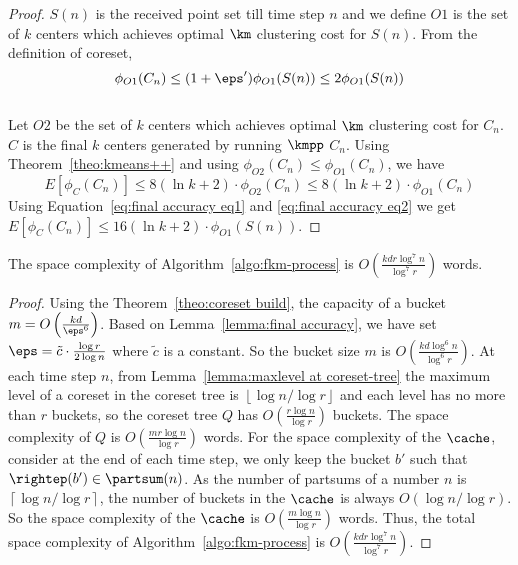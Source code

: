 {\begin{proof}
$S(n)$ is the received point set till time step $n$ and we define $O1$ is the set of $k$ centers which achieves optimal $\km$ clustering cost for $S(n)$. From the definition of coreset, 
\begin{equation}
\label{eq:final accuracy eq1}
\phi_{O1}(C_n) \le (1+\eps')\phi_{O1}(S(n)) \le 2\phi_{O1}(S(n))
\end{equation}
\\

Let $O2$ be the set of $k$ centers which achieves optimal $\km$ clustering cost for $C_n$. $C$ is the final $k$ centers generated by running $\kmpp$ $C_n$. Using Theorem~\ref{theo:kmeans++} and using $\phi_{O2}(C_n) \le \phi_{O1}(C_n)$, we have 
\begin{equation}
\label{eq:final accuracy eq2}
E\left[ \phi_C(C_n) \right] \le 8(\ln k+2)\cdot\phi_{O2}(C_n) \le 8(\ln k+2)\cdot\phi_{O1}(C_n)
\end{equation}
Using Equation~\ref{eq:final accuracy eq1} and \ref{eq:final accuracy eq2} we get $E\left[ \phi_C(C_n) \right] \le 16(\ln k+2)\cdot\phi_{O1}(S(n))$.
\end{proof}


\begin{lemma}
The space complexity of Algorithm~\ref{algo:fkm-process} is $O\left(\frac{kdr\log^7n}{\log^7r}\right)$ words. 
\end{lemma}
\begin{proof}
Using the Theorem~\ref{theo:coreset build}, the capacity of a bucket $m=O\left(\frac{kd}{\eps^6}\right)$. Based on Lemma~\ref{lemma:final accuracy}, we have set $\eps=\tilde{c}\cdot\frac{\log r}{2\log n}$ where $\tilde{c}$ is a constant. So the bucket size $m$ is $O\left(\frac{kd\log^6n}{\log^6r}\right)$. 
At each time step $n$, from Lemma~\ref{lemma:maxlevel at coreset-tree} the maximum level of a coreset in the coreset tree is $\left\lfloor\log n/\log r\right\rfloor$ and each level has no more than $r$ buckets, so the coreset tree $Q$ has $O\left(\frac{r \log n}{\log r}\right)$ buckets. The space complexity of $Q$ is $O\left(\frac{m r \log n}{\log r}\right)$ words.
For the space complexity of the $\cache$, consider at the end of each time step, we only keep the bucket $b'$ such that $\rightep(b') \in \partsum(n)$. 
As the number of partsums of a number $n$ is $\left\lceil \log n/\log r \right\rceil$, the number of buckets in the $\cache$ is always $O\left(\log n/\log r \right)$. So the space complexity of the $\cache$ is $O\left(\frac{m \log n}{\log r}\right)$ words.
Thus, the total space complexity of Algorithm~\ref{algo:fkm-process} is $O\left(\frac{kdr\log^7n}{\log^7r}\right)$.
\end{proof}


}
